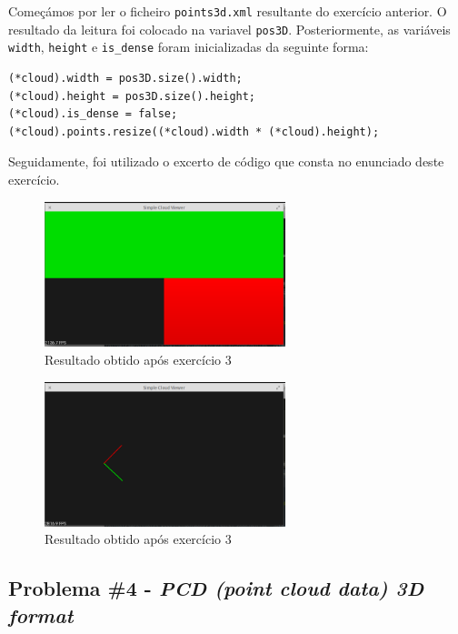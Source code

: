 \documentclass[portuguese, times, mirror]{revdetua}
\begin{document}
Começámos por ler o ficheiro \texttt{points3d.xml} resultante do exercício anterior. O resultado da leitura foi colocado na variavel \texttt{pos3D}. Posteriormente, as variáveis \texttt{width}, \texttt{height} e  \texttt{is\_dense} foram inicializadas da seguinte forma: 

\begin{lstlisting}[caption=Inicialização de variáveis ,label=code:C]
(*cloud).width = pos3D.size().width;
(*cloud).height = pos3D.size().height;
(*cloud).is_dense = false;
(*cloud).points.resize((*cloud).width * (*cloud).height);
\end{lstlisting}


Seguidamente, foi utilizado o excerto de código que consta no enunciado deste exercício. 

\begin{figure}[ht!]
\centering
\includegraphics[width=70mm]{img/ex3_1.png}
\caption{Resultado obtido após exercício 3}
\end{figure}


\begin{figure}[ht!]
\centering
\includegraphics[width=70mm]{img/ex3_2.png}
\caption{Resultado obtido após exercício 3}
\end{figure}



\subsection{Problema \#4 - \textit{PCD (point cloud data) 3D format}}
\end{document}
